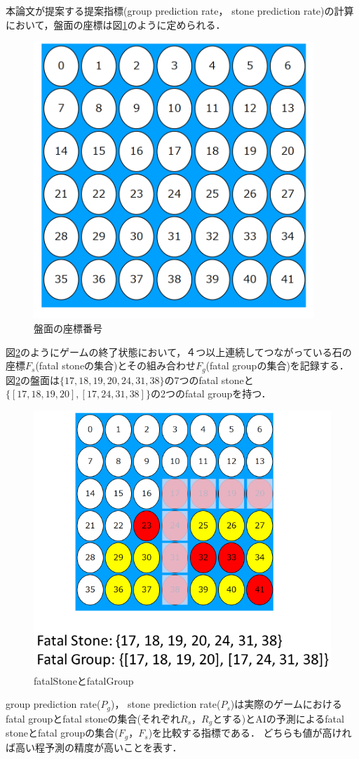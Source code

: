 本論文が提案する提案指標(group prediction rate， stone prediction rate)の計算において，盤面の座標は図\ref{fig:index}のように定められる．
\begin{figure}[t]
	\centering
	\includegraphics[width=300pt]{./figure/index.png}
	\caption{盤面の座標番号}
	\label{fig:index}
\end{figure}
図\ref{fig:fatalGroup}のようにゲームの終了状態において，４つ以上連続してつながっている石の座標$F_s$(fatal stoneの集合)とその組み合わせ$F_g$(fatal groupの集合)を記録する．
図\ref{fig:fatalGroup}の盤面は$\{17, 18, 19, 20, 24, 31, 38\}$の7つのfatal stoneと$\{[17, 18, 19, 20], [17, 24, 31, 38]\}$の2つのfatal groupを持つ．
\begin{figure}[t]
	\centering
	\includegraphics[width=\linewidth]{./figure/fatalGroup.png}
	\caption{fatalStoneとfatalGroup}
	\label{fig:fatalGroup}
\end{figure}
group prediction rate($P_g$)， stone prediction rate($P_s$)は実際のゲームにおけるfatal groupとfatal stoneの集合(それぞれ$R_s， R_g$とする)とAIの予測によるfatal stoneとfatal groupの集合($F_g， F_s$)を比較する指標である．
どちらも値が高ければ高い程予測の精度が高いことを表す．


